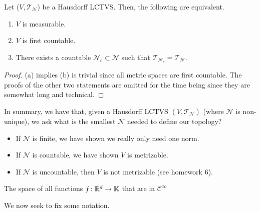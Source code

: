 \documentclass[11pt,leqno,oneside]{amsbook}
\numberwithin{thm}{section}
\newcommand{\Top}{\mathcal{T}} %
\newcommand{\cN}{\mathcal{N}}
\newcommand{\norms}{\cN}
\begin{document}
\begin{prop}
  Let (\(V,\Top_\norms\)) be a Hausdorff LCTVS. Then, the following
  are equivalent.
  \begin{enumerate}
  \item \(V\) is measurable.
  \item \(V\) is first countable.
  \item There exists a countable \(\norms_c \subset \norms\) such that
  \(\Top_{\norms_c} = \Top_\norms\). 
  \end{enumerate}
\end{prop}
\begin{proof}
  (a) implies (b) is trivial since all metric spaces are first
  countable. The proofs of the other two statements are omitted for
  the time being since they are somewhat long and technical. 
\end{proof}
\begin{rmk}
  In summary, we have that, given a Hausdorff LCTVS
  \((V,\Top_\norms)\) (where \(\norms\) is non-unique), we ask what is
  the smallest \(\norms\) needed to define our topology?
  \begin{itemize}
  \item If \(\norms\) is finite, we have shown we really only need one
    norm.
  \item If \(\norms\) is countable, we have shown \(V\) is metrizable.
  \item If \(\norms\) is uncountable, then \(V\) is not metrizable
    (see homework 6).
  \end{itemize}
\end{rmk}
\begin{example}
  The space of all functions \(f \colon {\mathbb R}^d \to \mathbb{K}\) that are
  in \(\mathcal{C}^\infty\)
\end{example}
We now seek to fix some notation.
\end{document}
